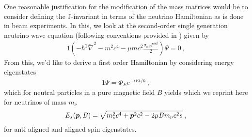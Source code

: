 One reasonable justification for the modification of the mass matrices would be to consider defining the J-invariant in terms of the neutrino Hamiltonian as is done in beam experiments. In this, we look at the second-order single generation neutrino wave equation (following conventions provided in ) given by 
\begin{alignat}{1}
	\label{nkgp:1} \left(-\hbar^{2}\widetilde\nabla^{2}-m^{2}c^{4}-\mu mc^{2}\frac{\sigma_{\alpha\beta}F^{\alpha\beta}}{2}\right)\Psi=0\,,
\end{alignat}
From this, we'd like to derive a first order Hamiltonian by considering energy eigenstates
\begin{alignat}{1}
	\label{eigen:1} \Psi = \Phi_{E}e^{-iEt/\hbar}\,,
\end{alignat}
which for neutral particles in a pure magnetic field $B$ yields  which we reprint here for neutrinos of mass $m_{\nu}$
\begin{alignat}{1}
	\label{eigen:2} E_{s}(\boldsymbol{p},B)=\sqrt{m_{\nu}^{2}c^{4}+\boldsymbol{p}^{2}c^{2}-2\mu B m_{\nu}c^{2}s}\;,
\end{alignat}
for anti-aligned and aligned spin eigenstates.

